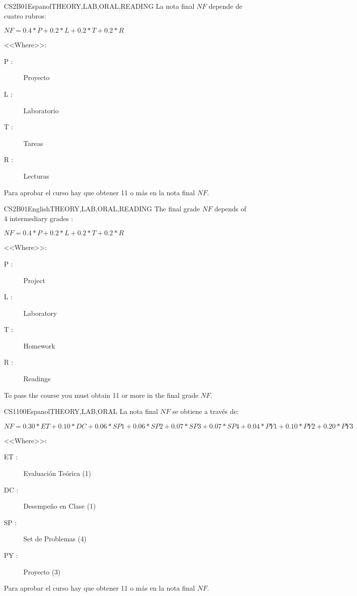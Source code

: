\begin{evaluation}{CS2B01}{Espanol}{THEORY,LAB,ORAL,READING}
La nota final $NF$ depende de cuatro rubros:

  $ NF = 0.4*P + 0.2*L + 0.2*T + 0.2*R $

<<Where>>:
  \begin{description}
		\item[P :] Proyecto
		\item[L :] Laboratorio
    \item[T :] Tareas
    \item[R :] Lecturas
	\end{description}

	Para aprobar el curso hay que obtener 11 o más en la nota final $NF$.
\end{evaluation}

\begin{evaluation}{CS2B01}{English}{THEORY,LAB,ORAL,READING}
The final grade $NF$ depends of 4 intermediary grades :

  $ NF = 0.4*P + 0.2*L + 0.2*T + 0.2*R $

<<Where>>:
\begin{description}
	\item[P :] Project
	\item[L :] Laboratory
	\item[T :] Homework
	\item[R :] Readings
	\end{description}

	To pass the course you must obtain 11 or more in the final grade $NF$.
\end{evaluation}


\begin{evaluation}{CS1100}{Espanol}{THEORY,LAB,ORAL}
La nota final $NF$ se obtiene a través de:

  $ NF = 0.30*ET + 0.10*DC + 0.06*SP1 + 0.06*SP2 + 0.07*SP3 + 0.07*SP4 +0.04*PY1
   + 0.10*PY2 + 0.20*PY3 $

<<Where>>:
  \begin{description}
		\item[ET :] Evaluación Teórica (1)
		\item[DC :] Desempeño en Clase (1)
    \item[SP :] Set de Problemas (4)
    \item[PY :] Proyecto (3)
	\end{description}

	Para aprobar el curso hay que obtener 11 o más en la nota final $NF$.
\end{evaluation}

